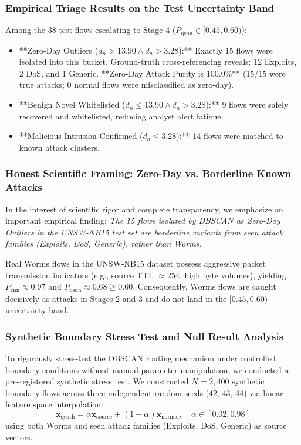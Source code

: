 \documentclass[preprint,12pt]{elsarticle}
\begin{document}
\subsubsection{Empirical Triage Results on the Test Uncertainty Band}
Among the 38 test flows escalating to Stage 4 ($P_{\text{qsnn}} \in [0.45, 0.60)$):
\begin{itemize}
    \item **Zero-Day Outliers ($d_n > 13.90 \land d_a > 3.28$):** Exactly 15 flows were isolated into this bucket. Ground-truth cross-referencing reveals: 12 Exploits, 2 DoS, and 1 Generic. **Zero-Day Attack Purity is 100.0\%** (15/15 were true attacks; 0 normal flows were misclassified as zero-day).
    \item **Benign Novel Whitelisted ($d_n \le 13.90 \land d_a > 3.28$):** 9 flows were safely recovered and whitelisted, reducing analyst alert fatigue.
    \item **Malicious Intrusion Confirmed ($d_a \le 3.28$):** 14 flows were matched to known attack clusters.
\end{itemize}

\subsubsection{Honest Scientific Framing: Zero-Day vs. Borderline Known Attacks}
In the interest of scientific rigor and complete transparency, we emphasize an important empirical finding: \textit{The 15 flows isolated by DBSCAN as Zero-Day Outliers in the UNSW-NB15 test set are borderline variants from seen attack families (Exploits, DoS, Generic), rather than Worms.} 

Real Worms flows in the UNSW-NB15 dataset possess aggressive packet transmission indicators (e.g., source TTL $\approx 254$, high byte volumes), yielding $P_{\text{cnn}} \approx 0.97$ and $P_{\text{qsnn}} \approx 0.68 \ge 0.60$. Consequently, Worms flows are caught decisively as attacks in Stages 2 and 3 and do not land in the $[0.45, 0.60)$ uncertainty band.

\subsubsection{Synthetic Boundary Stress Test and Null Result Analysis}
To rigorously stress-test the DBSCAN routing mechanism under controlled boundary conditions without manual parameter manipulation, we conducted a pre-registered synthetic stress test. We constructed $N = 2,400$ synthetic boundary flows across three independent random seeds (42, 43, 44) via linear feature space interpolation:
\begin{equation}
    \mathbf{x}_{\text{synth}} = \alpha \mathbf{x}_{\text{source}} + (1 - \alpha) \mathbf{x}_{\text{normal}}, \quad \alpha \in [0.02, 0.98]
\end{equation}
using both Worms and seen attack families (Exploits, DoS, Generic) as source vectors.
\end{document}
